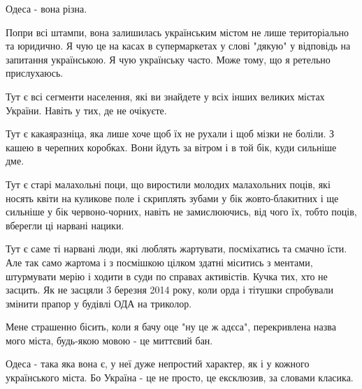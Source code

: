 Одеса - вона різна.

Попри всі штампи, вона залишилась українським містом не лише територіально та
юридично. Я чую це на касах в супермаркетах у слові "дякую" у відповідь на
запитання українською. Я чую українську часто. Може тому, що я ретельно
прислухаюсь.

Тут є всі сегменти населення, які ви знайдете у всіх інших великих містах
України. Навіть у тих, де не очікуєте.

Тут є какаяразніца, яка лише хоче щоб їх не рухали і щоб мізки не боліли. З
кашею в черепних коробках. Вони йдуть за вітром і в той бік, куди сильніше дме.

Тут є старі малахольні поци, що виростили молодих малахольних поців, які носять
квіти на куликове поле і скриплять зубами у бік жовто-блакитних і ще сильніше у
бік червоно-чорних, навіть не замислюючись, від чого їх, тобто поців, вберегли
ці нарвані нацики.

Тут є саме ті нарвані люди, які люблять жартувати, посміхатись та смачно їсти.
Але так само жартома і з посмішкою цілком здатні міситись з ментами, штурмувати
мерію і ходити в суди по справах активістів. Кучка тих, хто не засцить. Як не
засцяли 3 березня 2014 року, коли орда і тітушки спробували змінити прапор у
будівлі ОДА на триколор.

Мене страшенно бісить, коли я бачу оце "ну це ж адєса", перекривлена назва мого
міста, будь-якою мовою - це миттєвий бан.

Одеса - така яка вона є, у неї дуже непростий характер, як і у кожного
українського міста. Бо Україна - це не просто, це ексклюзив, за словами
класика.
